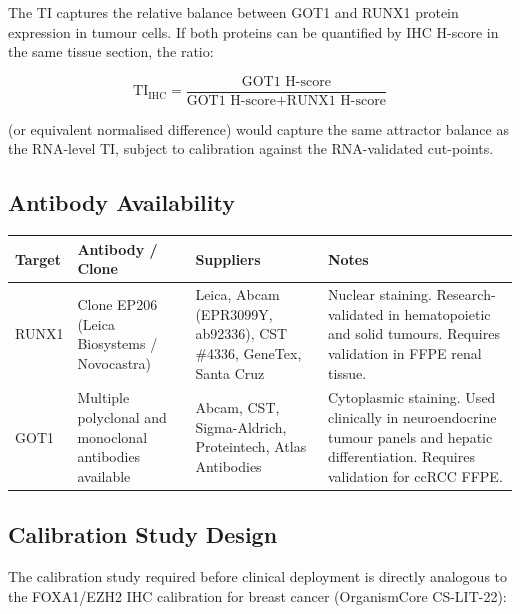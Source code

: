 \documentclass[11pt, a4paper]{article}
\begin{document}
The TI captures the relative balance between
GOT1 and RUNX1 protein expression in tumour
cells. If both proteins can be quantified
by IHC H-score in the same tissue section,
the ratio:

\[
\text{TI}_{\text{IHC}} =
\frac{\text{GOT1 H-score}}
     {\text{GOT1 H-score} + \text{RUNX1 H-score}}
\]

(or equivalent normalised difference)
would capture the same attractor balance
as the RNA-level TI, subject to calibration
against the RNA-validated cut-points.

\subsection{Antibody Availability}

\begin{center}
\begin{tabular}{p{2cm}p{3.5cm}p{3.5cm}p{3cm}}
\toprule
\textbf{Target} &
\textbf{Antibody / Clone} &
\textbf{Suppliers} &
\textbf{Notes} \\
\midrule
RUNX1 &
Clone EP206
(Leica Biosystems /
Novocastra) &
Leica, Abcam (EPR3099Y,
ab92336), CST \#4336,
GeneTex, Santa Cruz &
Nuclear staining.
Research-validated in
hematopoietic and solid
tumours. Requires
validation in FFPE
renal tissue. \\[0.5em]
GOT1 &
Multiple polyclonal
and monoclonal
antibodies available &
Abcam, CST, Sigma-Aldrich,
Proteintech,
Atlas Antibodies &
Cytoplasmic staining.
Used clinically in
neuroendocrine tumour
panels and hepatic
differentiation.
Requires validation
for ccRCC FFPE. \\
\bottomrule
\end{tabular}
\end{center}

\subsection{Calibration Study Design}

The calibration study required before
clinical deployment is directly analogous
to the FOXA1/EZH2 IHC calibration for
breast cancer (OrganismCore CS-LIT-22):
\end{document}
